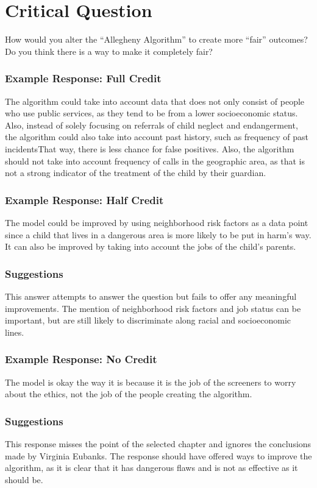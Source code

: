 \documentclass{article}
\begin{document}
\section{Critical Question}
    How would you alter the “Allegheny Algorithm” to create more “fair” outcomes? Do you think there is a way to make it completely fair? 

    \subsubsection{Example Response: Full Credit}
        The algorithm could take into account data that does not only consist of people who use public services, as they tend to be from a lower socioeconomic status. Also, instead of solely focusing on referrals of child neglect and endangerment, the algorithm could also take into account past history, such as frequency of past incidentsThat way, there is less chance for false positives. Also, the algorithm should not take into account frequency of calls in the geographic area, as that is not a strong indicator of the treatment of the child by their guardian. 

    \subsubsection{Example Response: Half Credit}
        The model could be improved by using neighborhood risk factors as a data point since a child that lives in a dangerous area is more likely to be put in harm’s way. It can also be improved by taking into account the jobs of the child’s parents.

        \subsubsection{Suggestions}
            This answer attempts to answer the question but fails to offer any meaningful improvements. The mention of neighborhood risk factors and job status can be important, but are still likely to discriminate along racial and socioeconomic lines. 

    \subsubsection{Example Response: No Credit}
        The model is okay the way it is because it is the job of the screeners to worry about the ethics, not the job of the people creating the algorithm.

        \subsubsection{Suggestions}
            This response misses the point of the selected chapter and ignores the conclusions made by Virginia Eubanks. The response should have offered ways to improve the algorithm, as it is clear that it has dangerous flaws and is not as effective as it should be. 




\end{document}
